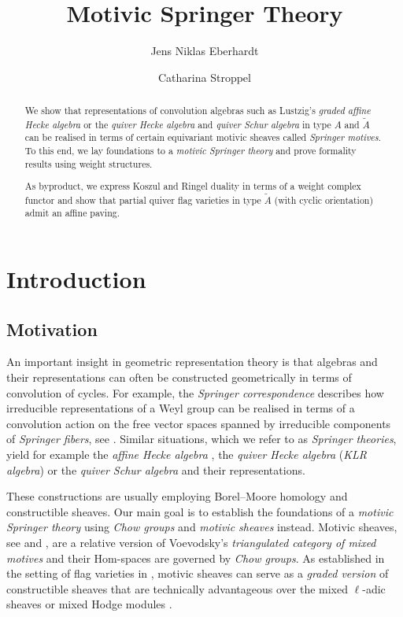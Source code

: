 \documentclass{amsart}
\title{Motivic Springer Theory}
\author{Jens Niklas Eberhardt}
\author{Catharina Stroppel}
\theoremstyle{plain}
\theoremstyle{TheoremNum}
\theoremstyle{definition}
\theoremstyle{remark}
\numberwithin{equation}{section}
\begin{document}
\maketitle
\begin{abstract}
We show that representations of convolution algebras such as Lustzig's \emph{graded affine Hecke algebra} or the \emph{quiver Hecke algebra} and \emph{quiver Schur algebra} in type $A$ and $\widetilde{A}$ can be realised in terms of certain equivariant motivic sheaves called \emph{Springer motives}. To this end, we lay foundations to a \emph{motivic Springer theory} and prove formality results using weight structures. 

As byproduct, we express Koszul and Ringel duality in terms of a weight complex functor and show that partial quiver flag varieties in type $\widetilde{A}$ (with cyclic orientation) admit an affine paving.
\end{abstract}
\section{Introduction}
\subsection*{Motivation} An important insight in geometric representation theory is that algebras and their representations can often be constructed geometrically in terms of convolution of cycles. For example, the
\emph{Springer correspondence} \cite{springer_construction_1978} describes how irreducible representations of a Weyl group can be realised in terms of a convolution action on the free vector spaces spanned by irreducible components of \emph{Springer fibers}, see \cite{chriss_representation_2010}. Similar situations, which we refer to as \emph{Springer theories}, yield for example the \emph{affine Hecke algebra} \cite{lusztig_proof_1987}, the \emph{quiver Hecke algebra} (\emph{KLR algebra}) \cite{rouquier_2-kac-moody_2008} or the \emph{quiver Schur algebra} \cite{stroppel_quiver_2014} and their representations.

These constructions are usually employing Borel--Moore homology and constructible sheaves. Our main goal is to establish the foundations of a \emph{motivic Springer theory} using \emph{Chow groups} and \emph{motivic sheaves} instead. Motivic sheaves, see \cite{ayoub_les_2007} and \cite{cisinski_triangulated_2019}, are a relative version of Voevodsky's \emph{triangulated category of mixed motives} and their Hom-spaces are governed by \emph{Chow groups}. As established in the setting of flag varieties in \cite{soergel_perverse_2018}, motivic sheaves can serve as a \emph{graded version} of constructible sheaves that are technically advantageous over the mixed $\ell$-adic sheaves \cite{beilinson_faisceaux_1982} or mixed Hodge modules \cite{saito_young_2016}.
\end{document}
